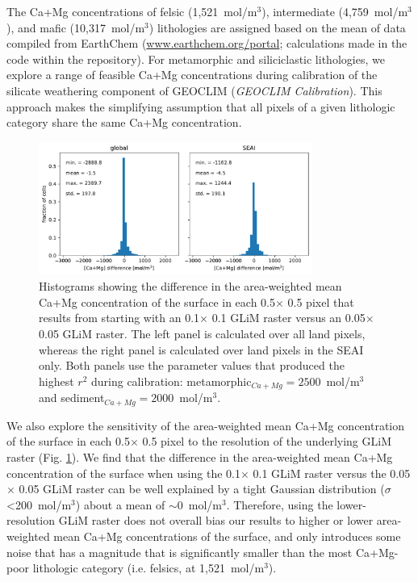 \documentclass[11pt,letterpaper]{article}
\newcommand{\degrees}{\textdegree\xspace}
\begin{document}
The Ca+Mg concentrations of felsic (1,521~mol/m$^{3}$), intermediate (4,759~mol/m$^{3}$), and mafic (10,317~mol/m$^{3}$) lithologies are assigned based on the mean of data compiled from EarthChem (\url{www.earthchem.org/portal}; calculations made in the code within the repository). For metamorphic and siliciclastic lithologies, we explore a range of feasible Ca+Mg concentrations during calibration of the silicate weathering component of GEOCLIM (\textit{GEOCLIM Calibration}). This approach makes the simplifying assumption that all pixels of a given lithologic category share the same Ca+Mg concentration.

\begin{figure}[h!]
    \centering
    \includegraphics[width=0.8\textwidth]{Figures/resolution_sensitivity.pdf}
    \caption{Histograms showing the difference in the area-weighted mean Ca+Mg concentration of the surface in each 0.5\degrees $\times$ 0.5\degrees pixel that results from starting with an 0.1\degrees $\times$ 0.1\degrees GLiM raster versus an 0.05\degrees $\times$ 0.05\degrees GLiM raster. The left panel is calculated over all land pixels, whereas the right panel is calculated over land pixels in the SEAI only. Both panels use the parameter values that produced the highest $r^{2}$ during calibration: metamorphic$_{Ca+Mg}=2500$~mol/m$^{3}$ and sediment$_{Ca+Mg}=2000$~mol/m$^{3}$.}
    \label{fig:resolution_sensitivity}
\end{figure}

We also explore the sensitivity of the area-weighted mean Ca+Mg concentration of the surface in each 0.5\degrees $\times$ 0.5\degrees pixel to the resolution of the underlying GLiM raster (Fig. \ref{fig:resolution_sensitivity}). We find that the difference in the area-weighted mean Ca+Mg concentration of the surface when using the 0.1\degrees $\times$ 0.1\degrees GLiM raster versus the 0.05\degrees $\times$ 0.05\degrees GLiM raster can be well explained by a tight Gaussian distribution ($\sigma$\textless200~mol/m$^{3}$) about a mean of $\sim$0~mol/m$^{3}$. Therefore, using the lower-resolution GLiM raster does not overall bias our results to higher or lower area-weighted mean Ca+Mg concentrations of the surface, and only introduces some noise that has a magnitude that is significantly smaller than the most Ca+Mg-poor lithologic category (i.e. felsics, at 1,521~mol/m$^{3}$).
\end{document}
